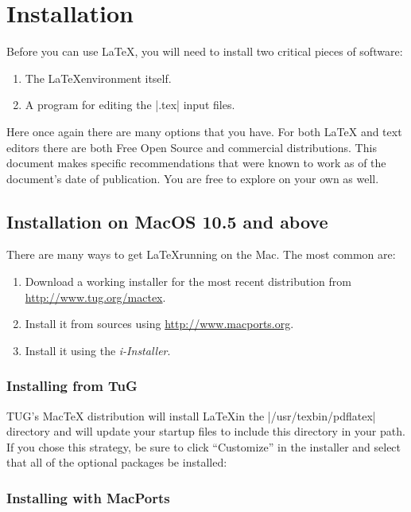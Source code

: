 \section{Installation}
Before you can use \LaTeX, you will need to install two critical
pieces of software:
\begin{enumerate}
\item The \LaTeX environment itself.
\item A program for editing the |.tex| input files.
\end{enumerate}

Here once again there are many options that you have. For both \LaTeX
and text editors there are both Free Open Source and commercial
distributions. This document makes specific recommendations that were
known to work as of the document's date of publication. You are free
to explore on your own as well.


\subsection{Installation on MacOS 10.5 and above}

There are many ways to get \LaTeX running on the Mac. The most common
are:

\begin{enumerate}
\item Download a working installer for the most recent distribution
  from \url{http://www.tug.org/mactex}.
\item Install it from sources using \url{http://www.macports.org}.
\item Install it using the \textit{i-Installer}.
\end{enumerate}

\subsubsection{Installing from TuG}

TUG's MacTeX distribution will install \LaTeX in the
|/usr/texbin/pdflatex| directory and will update your startup files to
include this directory in your path. If you chose this strategy, be
sure to click ``Customize'' in the installer and select that all of
the optional packages be installed:

\subsubsection{Installing with MacPorts}

